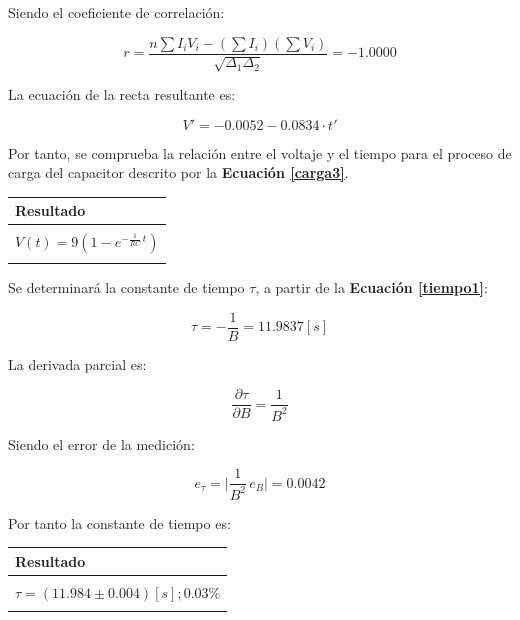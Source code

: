\documentclass[letter,11pt]{article}
\begin{document}
Siendo el coeficiente de correlación:

\begin{equation*}
    r = \frac{n \sum I_i V_i - (\sum I_i)(\sum V_i)}{\sqrt{\Delta_1 \Delta_2}} = -1.0000
\end{equation*}

La ecuación de la recta resultante es:

\begin{equation*}
    V' = -0.0052 - 0.0834 \cdot t'
\end{equation*}

Por tanto, se comprueba la relación entre el voltaje y el tiempo para el proceso
de carga del capacitor descrito por la \textbf{Ecuación \ref{carga3}}.

\begin{center}
\begin{tabular}{|>{\centering}m{9.2cm}<{\centering}|}
\hline
\textbf{Resultado} 
\tabularnewline \hline
\\
\Large{$V(t) = 9 \left( 1 - e^{-\frac{1}{RC}\,t} \right) $} \tabularnewline
\\
\hline
\end{tabular}
\end{center}

Se determinará la constante de tiempo $\tau$, a partir de la
\textbf{Ecuación \ref{tiempo1}}:

\begin{equation*}
    \tau = - \frac{1}{B} = 11.9837 [s]
\end{equation*}

La derivada parcial es:

\begin{equation*}
    \frac{\partial \tau}{\partial B} = \frac{1}{B^2}
\end{equation*}

Siendo el error de la medición:

\begin{equation*}
    e_{\tau} = \Biggr| \frac{1}{B^2}\,e_B \Biggr| = 0.0042
\end{equation*}

Por tanto la constante de tiempo es:

\begin{center}
\begin{tabular}{|>{\centering}m{12.0cm}<{\centering}|}
\hline
\textbf{Resultado}
\tabularnewline \hline
\\
    $\tau = (11.984 \pm 0.004)[s]; 0.03\%$ \tabularnewline
\\
\hline
\end{tabular}
\end{center}
\end{document}
